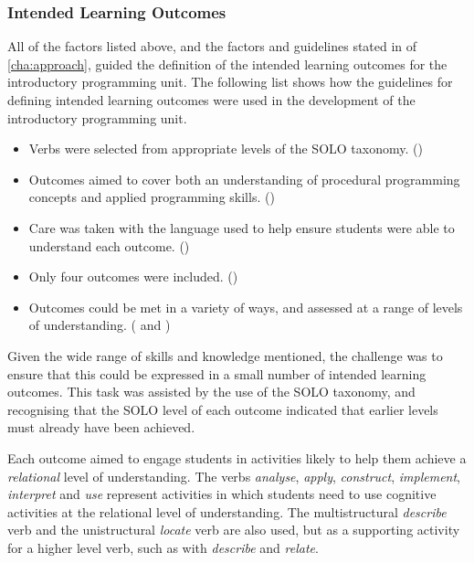 

\subsubsection{Intended Learning Outcomes} %
\label{ssub:intro_intended_learning_outcomes}

All of the factors listed above, and the factors and guidelines stated in  of \cref{cha:approach}, guided the definition of the intended learning outcomes for the introductory programming unit. The following list shows how the guidelines for defining intended learning outcomes were used in the development of the introductory programming unit.

\begin{itemize}[noitemsep,nolistsep]
	\item Verbs were selected from appropriate levels of the SOLO taxonomy. () 
	\item Outcomes aimed to cover both an understanding of procedural programming concepts and applied programming skills. ()
	\item Care was taken with the language used to help ensure students were able to understand each outcome. ()
	\item Only four outcomes were included. ()
	\item Outcomes could be met in a variety of ways, and assessed at a range of levels of understanding. ( and )
\end{itemize}

Given the wide range of skills and knowledge mentioned, the challenge was to ensure that this could be expressed in a small number of intended learning outcomes. This task was assisted by the use of the SOLO taxonomy, and recognising that the SOLO level of each outcome indicated that earlier levels must already have been achieved.

Each outcome aimed to engage students in activities likely to help them achieve a \emph{relational} level of understanding. The verbs \emph{analyse}, \emph{apply}, \emph{construct}, \emph{implement}, \emph{interpret} and \emph{use} represent activities in which students need to use cognitive activities at the relational level of understanding. The multistructural \emph{describe} verb and the unistructural \emph{locate} verb are also used, but as a supporting activity for a higher level verb, such as with \emph{describe} and \emph{relate}.

